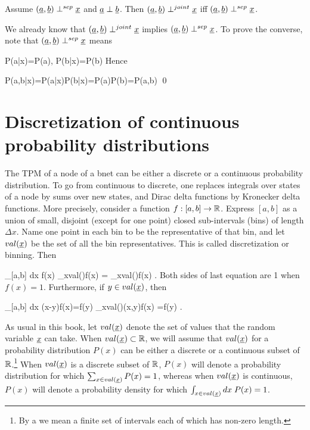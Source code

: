 \begin{claim}
Assume
$(\rva,\rvb)\perp^{sep} \rvx$
and $\rva\perp\rvb$. Then
$(\rva, \rvb)\perp^{joint} \rvx$
iff
$(\rva, \rvb)\perp^{sep} \rvx$.
\end{claim}
\proof
We already know that $(\rva, \rvb)\perp^{joint}\rvx$ implies $(\rva, \rvb)\perp^{sep}\rvx$.
To prove the converse, note that
$(\rva, \rvb)\perp^{sep}\rvx$ means

\beq
P(a|x)=P(a)\;,\;\; P(b|x)=P(b)
\eeq
Hence

\beq
P(a,b|x)=P(a|x)P(b|x)=P(a)P(b)=P(a,b)
\eeq
\qed

\section{Discretization
of continuous
probability distributions}

The TPM of a node
of a bnet can be either a discrete or
a continuous probability distribution.
To go from continuous to discrete, one
replaces integrals over states of a node
 by sums over new states, and Dirac delta
functions by Kronecker delta functions.
 More precisely, consider a function
$f: [a, b]\rightarrow { \mathbb{R}}$. Express
 $[a,b]$ as
a union of
small, disjoint (except for
one point) closed sub-intervals (bins) of
length $\Delta x$.
Name one point
in each bin to be the representative of that bin,
and  let $val(\rvx)$ be the
set of all the bin representatives. This is called
discretization or binning. Then

\beq
{}
\int_{[a,b]} dx \; f(x)\rarrow
{} \sum_{x\in val(\rvx)}f(x)
=
 \sum_{x\in val(\rvx)}f(x)
 \;.
\eeq
Both sides of last equation are 1 when $f(x)=1$.
 Furthermore, if $y\in val(\rvx)$, then

\beq
\int_{[a,b]} dx \; \delta(x-y)f(x)=f(y)
\rarrow \sum_{x\in val(\rvx)}\delta(x,y)f(x)
=f(y)
\;.
\eeq

As usual in this book, let $val(\rvx)$ denote the set of
values that the random variable $\rvx$ can take.
When $val(\rvx)\subset \RR$,
we will assume that $val(\rvx)$
for a probability distribution $P(x)$
can be either a discrete or a continuous
subset of ${ \mathbb{R}}$.\footnote{By a  we
mean a finite set of intervals
 each of which has non-zero length.}
When $val(\rvx)$ is a discrete subset of ${ \mathbb{R}}$, $P(x)$
will denote a probability distribution
for which $\sum_{x\in val(\rvx)}P(x)=1$, whereas when
$val(\rvx)$ is continuous, $P(x)$ will denote
a probability density
for which $\int_{x\in val(\rvx)}dx\; P(x)=1$.


